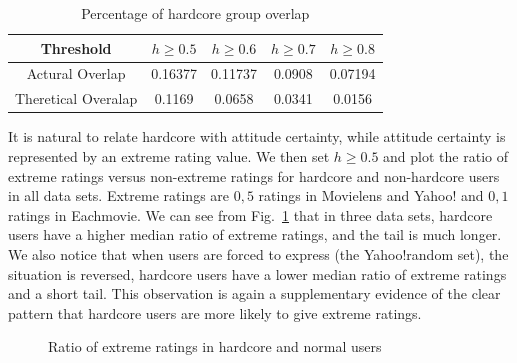 \documentclass{sig-alternate}
\begin{document}
\begin{table}[htbp]
\centering
\caption{Percentage of hardcore group overlap}\label{tab:overlap}
\centering
\begin{tabular}{|c|c|c|c|c|}
\hline
 Threshold & $h\geq 0.5$ & $h\geq 0.6$ & $h \geq 0.7$ & $h\geq 0.8$ \\\hline\hline
Actural Overlap& 0.16377 &	0.11737 &	0.0908 & 0.07194 \\\hline
Theretical Overalap & 0.1169 &  0.0658 &  0.0341 & 0.0156\\
\hline
\end{tabular}
\end{table}

It is natural to relate hardcore with attitude certainty, while attitude certainty is represented by an extreme rating value. We then set $h\geq 0.5$ and plot the ratio of extreme ratings versus non-extreme ratings for hardcore and non-hardcore users in all data sets. Extreme ratings are $0,5$ ratings in Movielens and Yahoo! and $0,1$ ratings in Eachmovie. We can see from Fig.~\ref{fig:hardcore} that in three data sets, hardcore users have a higher median ratio of extreme ratings, and the tail is much longer. We also notice that when users are forced to express (the Yahoo!random set), the situation is reversed, hardcore users have a lower median ratio of extreme ratings and a short tail.  This observation is again a supplementary evidence of the clear pattern that hardcore users are more likely to give extreme ratings.

\begin{figure}[htbp]
\centering
\centering
{}
\caption{Ratio of extreme ratings in hardcore and normal users}
\label{fig:hardcore}
\end{figure}
\end{document}
